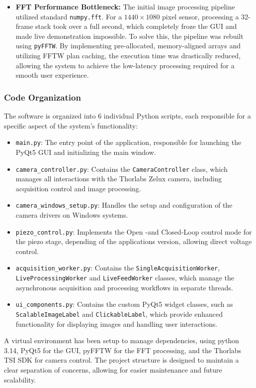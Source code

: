 \documentclass[12pt,a4paper]{article}
\begin{document}
\begin{itemize}
                \item \textbf{FFT Performance Bottleneck:}
                The initial image processing pipeline utilized standard \texttt{numpy.fft}. For a $1440 \times 1080$ pixel sensor, processing a 32-frame stack took over a full second, which completely froze the \ac{GUI} and made live demonstration impossible. To solve this, the pipeline was rebuilt using \texttt{pyFFTW}. By implementing pre-allocated, memory-aligned arrays and utilizing \ac{FFTW} plan caching, the execution time was drastically reduced, allowing the system to achieve the low-latency processing required for a smooth user experience.
            \end{itemize}
            
        \subsubsection{Code Organization}
            The software is organized into 6 individual Python scripts, each responsible for a specific aspect of the system's functionality:
            \begin{itemize}
                \item \texttt{main.py}: The entry point of the application, responsible for launching the PyQt5 GUI and initializing the main window.
                \item \texttt{camera\_controller.py}: Contains the \texttt{CameraController} class, which manages all interactions with the Thorlabs Zelux camera, including acquisition control and image processing.
                \item \texttt{camera\_windows\_setup.py}: Handles the setup and configuration of the camera drivers on Windows systems.
                \item \texttt{piezo\_control.py}: Implements the Open -and Closed-Loop control mode for the piezo stage, depending of the applications version, allowing direct voltage control.
                \item \texttt{acquisition\_worker.py}: Contains the \texttt{SingleAcquisitionWorker}, \texttt{LiveProcessingWorker} and \texttt{LiveFeedWorker} classes, which manage the asynchronous acquisition and processing workflows in separate threads.
                \item \texttt{ui\_components.py}: Contains the custom PyQt5 widget classes, such as \texttt{ScalableImageLabel} and \texttt{ClickableLabel}, which provide enhanced functionality for displaying images and handling user interactions.
            \end{itemize}
            A virtual environment has been setup to manage dependencies, using python 3.14, PyQt5 for the \ac{GUI}, pyFFTW for the FFT processing, and the Thorlabs \ac{TSI} \ac{SDK} for camera control. The project structure is designed to maintain a clear separation of concerns, allowing for easier maintenance and future scalability.
\end{document}
